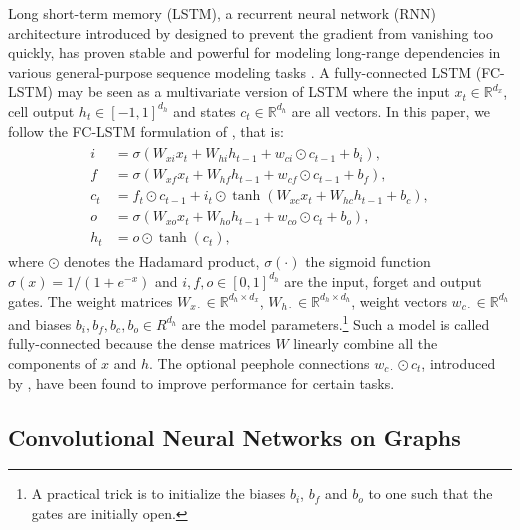 \documentclass{article} %
\newcommand{\R}{\mathbb{R}}
\begin{document}
Long short-term memory (LSTM), a recurrent neural network (RNN) architecture
introduced by \citet{lstm} designed to prevent the gradient from vanishing too
quickly, has proven stable and powerful for modeling long-range dependencies in
various general-purpose sequence modeling tasks \citep{seq_graves, seq2seq}. A
fully-connected LSTM (FC-LSTM) may be seen as a multivariate version of LSTM
where the input $x_t \in \R^{d_x}$, cell output $h_t \in [-1,1]^{d_h}$ and
states $c_t \in \R^{d_h}$ are all vectors. In this paper, we follow the FC-LSTM
formulation of \citet{convlstm}, that is:
\begin{align} \label{eqn:lstm_fc}
\begin{split}
	i &= \sigma(W_{xi} x_t + W_{hi} h_{t-1} + w_{ci} \odot c_{t-1} + b_i), \\
	f &= \sigma(W_{xf} x_t + W_{hf} h_{t-1} + w_{cf} \odot c_{t-1} + b_f), \\
	c_t &= f_t \odot c_{t-1} + i_t \odot \tanh(W_{xc} x_t + W_{hc} h_{t-1} + b_c), \\
	o &= \sigma(W_{xo} x_t + W_{ho} h_{t-1} + w_{co} \odot c_t + b_o), \\
	h_t &= o \odot \tanh(c_t),
\end{split}
\end{align}
where $\odot$ denotes the Hadamard product, $\sigma(\cdot)$ the sigmoid
function $\sigma(x) = 1 / (1+e^{-x})$ and $i, f, o \in [0,1]^{d_h}$ are the
input, forget and output gates. The weight matrices $W_{x\cdot} \in \R^{d_h
\times d_x}$, $W_{h\cdot} \in \R^{d_h \times d_h}$, weight vectors $w_{c\cdot}
\in \R^{d_h}$ and biases $b_i, b_f, b_c, b_o \in R^{d_h}$ are the model
parameters.\footnote{A practical trick is to initialize the biases $b_i$, $b_f$
and $b_o$ to one such that the gates are initially open.} 
Such a model is called fully-connected because the dense matrices $W$ linearly combine all the components of $x$ and $h$.
The optional peephole connections $w_{c\cdot} \odot c_t$, introduced by \citet{peephole}, have been found to improve performance for certain tasks.


\subsection{Convolutional Neural Networks on Graphs}
\end{document}
